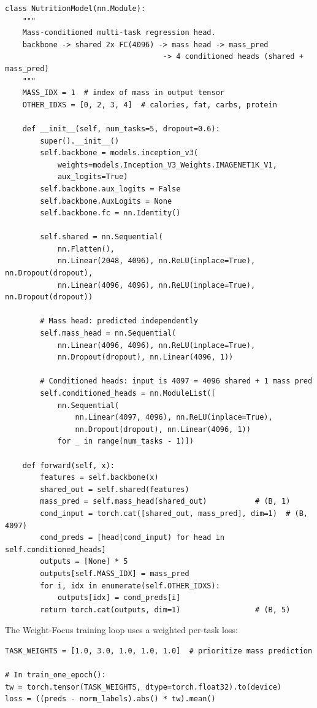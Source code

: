 \documentclass[11pt,a4paper]{article}
\begin{document}
\begin{lstlisting}[caption={NutritionModel class --- Weight-Focus architecture with mass-conditioned heads.}]
class NutritionModel(nn.Module):
    """
    Mass-conditioned multi-task regression head.
    backbone -> shared 2x FC(4096) -> mass head -> mass_pred
                                    -> 4 conditioned heads (shared + mass_pred)
    """
    MASS_IDX = 1  # index of mass in output tensor
    OTHER_IDXS = [0, 2, 3, 4]  # calories, fat, carbs, protein

    def __init__(self, num_tasks=5, dropout=0.6):
        super().__init__()
        self.backbone = models.inception_v3(
            weights=models.Inception_V3_Weights.IMAGENET1K_V1,
            aux_logits=True)
        self.backbone.aux_logits = False
        self.backbone.AuxLogits = None
        self.backbone.fc = nn.Identity()

        self.shared = nn.Sequential(
            nn.Flatten(),
            nn.Linear(2048, 4096), nn.ReLU(inplace=True), nn.Dropout(dropout),
            nn.Linear(4096, 4096), nn.ReLU(inplace=True), nn.Dropout(dropout))

        # Mass head: predicted independently
        self.mass_head = nn.Sequential(
            nn.Linear(4096, 4096), nn.ReLU(inplace=True),
            nn.Dropout(dropout), nn.Linear(4096, 1))

        # Conditioned heads: input is 4097 = 4096 shared + 1 mass pred
        self.conditioned_heads = nn.ModuleList([
            nn.Sequential(
                nn.Linear(4097, 4096), nn.ReLU(inplace=True),
                nn.Dropout(dropout), nn.Linear(4096, 1))
            for _ in range(num_tasks - 1)])

    def forward(self, x):
        features = self.backbone(x)
        shared_out = self.shared(features)
        mass_pred = self.mass_head(shared_out)           # (B, 1)
        cond_input = torch.cat([shared_out, mass_pred], dim=1)  # (B, 4097)
        cond_preds = [head(cond_input) for head in self.conditioned_heads]
        outputs = [None] * 5
        outputs[self.MASS_IDX] = mass_pred
        for i, idx in enumerate(self.OTHER_IDXS):
            outputs[idx] = cond_preds[i]
        return torch.cat(outputs, dim=1)                 # (B, 5)
\end{lstlisting}

The Weight-Focus training loop uses a weighted per-task loss:
\begin{lstlisting}[caption={Weighted loss computation in Weight-Focus training.}]
TASK_WEIGHTS = [1.0, 3.0, 1.0, 1.0, 1.0]  # prioritize mass prediction

# In train_one_epoch():
tw = torch.tensor(TASK_WEIGHTS, dtype=torch.float32).to(device)
loss = ((preds - norm_labels).abs() * tw).mean()
\end{lstlisting}
\end{document}
